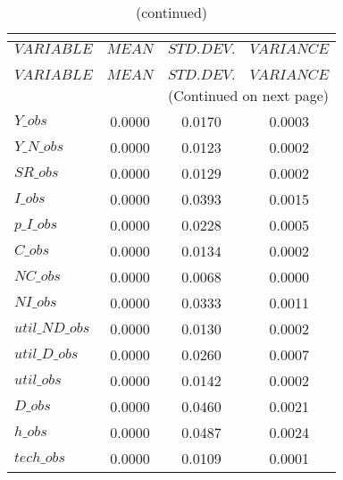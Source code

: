  
\begin{center}
\begin{longtable}{lccc} 
\caption{THEORETICAL MOMENTS}\\
 \label{Table:th_moments}\\
\toprule 
$VARIABLE       $	 & 	 $         MEAN$	 & 	 $    STD. DEV.$	 & 	 $     VARIANCE$\\
\midrule \endfirsthead 
\caption{(continued)}\\
 \toprule \\ 
$VARIABLE       $	 & 	 $         MEAN$	 & 	 $    STD. DEV.$	 & 	 $     VARIANCE$\\
\midrule \endhead 
\midrule \multicolumn{4}{r}{(Continued on next page)} \\ \bottomrule \endfoot 
\bottomrule \endlastfoot 
$Y\_obs         $	 & 	       0.0000	 & 	       0.0170	 & 	       0.0003 \\ 
$Y\_N\_obs      $	 & 	       0.0000	 & 	       0.0123	 & 	       0.0002 \\ 
$SR\_obs        $	 & 	       0.0000	 & 	       0.0129	 & 	       0.0002 \\ 
$I\_obs         $	 & 	       0.0000	 & 	       0.0393	 & 	       0.0015 \\ 
$p\_I\_obs      $	 & 	       0.0000	 & 	       0.0228	 & 	       0.0005 \\ 
$C\_obs         $	 & 	       0.0000	 & 	       0.0134	 & 	       0.0002 \\ 
$NC\_obs        $	 & 	       0.0000	 & 	       0.0068	 & 	       0.0000 \\ 
$NI\_obs        $	 & 	       0.0000	 & 	       0.0333	 & 	       0.0011 \\ 
$util\_ND\_obs  $	 & 	       0.0000	 & 	       0.0130	 & 	       0.0002 \\ 
$util\_D\_obs   $	 & 	       0.0000	 & 	       0.0260	 & 	       0.0007 \\ 
$util\_obs      $	 & 	       0.0000	 & 	       0.0142	 & 	       0.0002 \\ 
$D\_obs         $	 & 	       0.0000	 & 	       0.0460	 & 	       0.0021 \\ 
$h\_obs         $	 & 	       0.0000	 & 	       0.0487	 & 	       0.0024 \\ 
$tech\_obs      $	 & 	       0.0000	 & 	       0.0109	 & 	       0.0001 \\ 
\end{longtable}
 \end{center}
